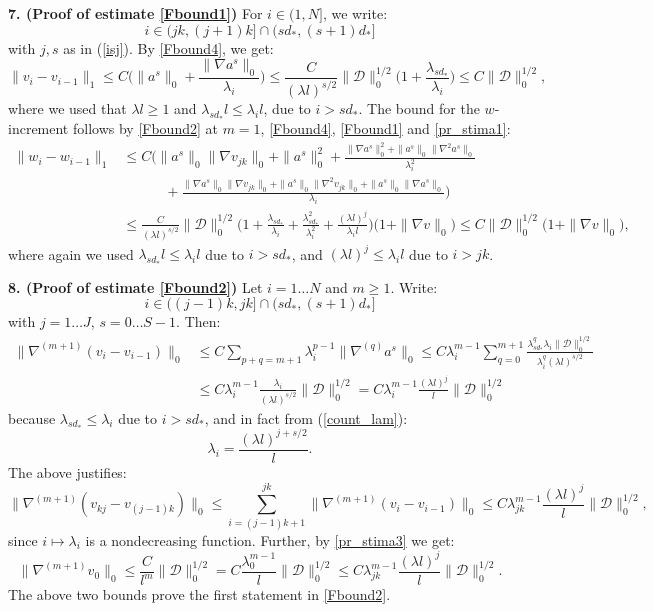 \documentclass[reqno,twoside,11pt]{amsart}
\numberwithin{equation}{section}
\theoremstyle{plain}
\theoremstyle{definition}
\begin{document}
\bigskip

{\bf 7. (Proof of estimate \ref{Fbound1})} For $i\in(1, N]$, we write:
$$i\in (jk, (j+1)k]\cap (sd_*, (s+1)d_*]$$ 
with $j,s$ as in (\ref{isj}). By \ref{Fbound4}, we get:
\begin{equation*}
\|v_i-v_{i-1}\|_1\leq C\Big(\|a^s\|_0 +
\frac{\|\nabla a^s\|_0}{\lambda_i}\Big) \leq \frac{C}{(\lambda
  l)^{s/2}}\|\mathcal{D}\|^{1/2}_0\big(1+
\frac{\lambda_{sd_*}}{\lambda_i }\big)\leq C\|\mathcal{D}\|^{1/2}_0,
\end{equation*}
where we used that $\lambda l\geq 1$ and $\lambda_{sd_*} l \leq
\lambda_i l$, due to  $i>sd_*$. The bound for the $w$-increment follows by
\ref{Fbound2} at $m=1$, \ref{Fbound4}, \ref{Fbound1} and \ref{pr_stima1}:
\begin{equation*}
\begin{split}
\|w_i-w_{i-1}\|_1 &\leq C\Big(\|a^s\|_0 \|\nabla v_{jk}\|_0 +
\|a^s\|_0^2 + \frac{\|\nabla a^s\|_0^2 + \|a^s\|_0 \|\nabla^2
  a^s\|_0}{\lambda_i^2} \\ & \quad \qquad + \frac{\|\nabla a^s\|_0\|\nabla v_{jk}\|_0
  +\|a^s\|_0\|\nabla^2 v_{jk}\|_0 + \|a^s\|_0 \|\nabla a^s\|_0}{\lambda_i}
\Big) \\ & \leq \frac{C}{(\lambda l)^{s/2}}\|\mathcal{D}\|^{1/2}_0\big(1+
\frac{\lambda_{sd_*}}{\lambda_i }+\frac{\lambda_{sd_*}^2}{\lambda_i^2}
  +\frac{(\lambda l)^j}{\lambda_il} \big)\big(1+\|\nabla v\|_0\big)\leq
C\|\mathcal{D}\|^{1/2}_0 \big(1+\|\nabla v\|_0\big),
\end{split}
\end{equation*}
where again we used $\lambda_{sd_*} l \leq \lambda_i l$ due to
$i>sd_*$, and $(\lambda l)^j\leq \lambda_il$ due to $i>jk$.

\medskip

{\bf 8. (Proof of estimate \ref{Fbound2})} Let $i=1\ldots N$ and $m\geq 1$. Write: 
$$i\in ((j-1)k, jk]\cap (sd_*, (s+1)d_*]$$ 
with $j=1\ldots J$, $s=0\ldots S-1$. Then:
\begin{equation*}
\begin{split}
\|\nabla^{(m+1)}(v_i-v_{i-1})\|_0 & \leq C
\sum_{p+q=m+1}\lambda_i^{p-1}\|\nabla^{(q)}a^s\|_0 \leq C\lambda_i^{m-1}
\sum_{q=0}^{m+1}\frac{\lambda_{sd_*}^q \lambda_i \|\mathcal{D}\|_0^{1/2}}{\lambda_i^q (\lambda l)^{s/2}}
\\ & \leq C \lambda_i^{m-1} \frac{\lambda_i}{(\lambda l)^{s/2} }
\|\mathcal{D}\|_0^{1/2} = C \lambda_i^{m-1}
\frac{(\lambda l)^j}{l} \|\mathcal{D}\|_0^{1/2}
\end{split}
\end{equation*}
because $\lambda_{sd_*} \leq \lambda_i $ due to $i>sd_*$, and in fact from (\ref{count_lam}):
$$\lambda_i=\frac{(\lambda l)^{j+s/2}}{l}.$$ 
The above justifies:
$$\|\nabla^{(m+1)}(v_{kj} - v_{(j-1)k})\|_0 \leq \sum_{i=(j-1)k+1}^{jk}\|\nabla^{(m+1)}(v_i-v_{i-1})\|_0
\leq C\lambda_{jk}^{m-1}\frac{(\lambda l)^j}{l} \|\mathcal{D}\|_0^{1/2},$$
since $i\mapsto \lambda_i$ is a nondecreasing function. Further, by
\ref{pr_stima3} we get:
$$\|\nabla^{(m+1)}v_0\|_0\leq \frac{C}{l^m}\|\mathcal{D}\|_0^{1/2} =
C\frac{\lambda_0^{m-1}}{l} \|\mathcal{D}\|_0^{1/2}\leq
C\lambda_{jk}^{m-1}\frac{(\lambda l)^j}{l} \|\mathcal{D}\|_0^{1/2}.$$ 
The above two bounds prove the first statement in \ref{Fbound2}. 
\end{document}
